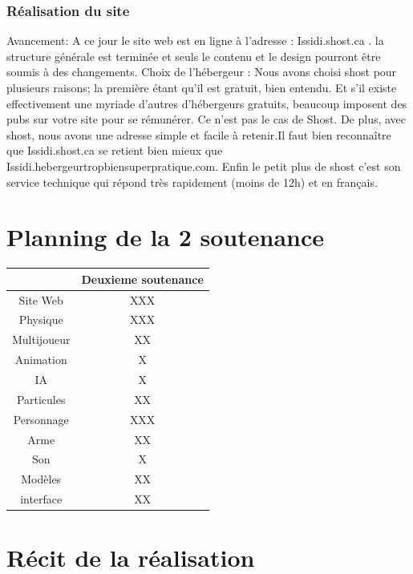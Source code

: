 ﻿\documentclass{article}
\begin{document}
	\subsubsection{Réalisation du site}
	Avancement:
	A ce jour le site web est en ligne à l'adresse : Issidi.shost.ca . la structure générale 
est terminée et seuls le contenu et le design	pourront être soumis à des changements.
	Choix de l'hébergeur :
	Nous avons choisi shost pour plusieurs raisons; la première étant qu'il est gratuit, bien entendu. Et s'il existe effectivement une myriade d'autres d'hébergeurs gratuits, beaucoup imposent des  pubs sur votre site pour se rémunérer. Ce n'est pas le cas de Shost.
De plus, avec shost, nous avons une adresse simple et facile à retenir.Il faut bien reconnaître 
que Issidi.shost.ca se retient bien mieux que Issidi.hebergeurtropbiensuperpratique.com.
Enfin le petit plus de shost  c'est son service technique qui répond très rapidement (moins de 12h) et en français.

 

	
\section{Planning de la 2\ieme{} soutenance}
\begin{tabular}{|c|c|}
\hline
			& Deuxieme soutenance\\ \hline
Site Web	& XXX	\\ \hline
Physique	& XXX	\\ \hline
Multijoueur	& XX	\\ \hline
Animation	& X		\\ \hline
IA	        & X		\\ \hline
Particules	& XX	\\ \hline
Personnage	& XXX	\\ \hline
Arme		& XX	\\ \hline
Son			& X		\\ \hline
Modèles		& XX	\\ \hline
interface	& XX	\\ \hline
\end{tabular}

\section{Récit de la réalisation}
\end{document}
